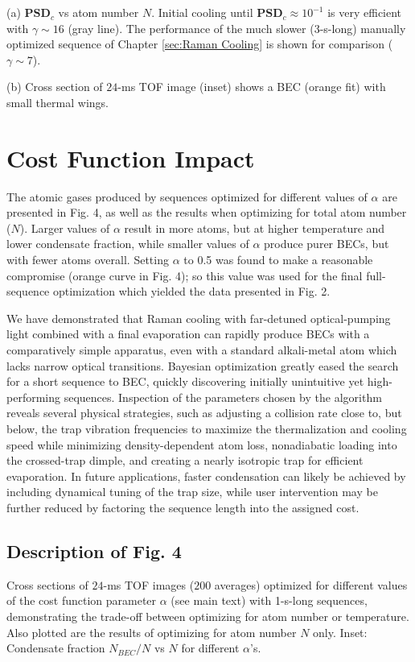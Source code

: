 \documentclass{article}
\begin{document}
(a) $\mathbf{PSD}_c$ vs atom number $N$. Initial cooling until $\mathbf{PSD}_c \approx 10^{-1}$ is very efficient with $\gamma \sim 16$ (gray line). The performance of the much slower (3-s-long) manually optimized sequence of Chapter \ref{sec:Raman Cooling} is shown for comparison ($\gamma \sim 7$). 

(b) Cross section of $24$-ms TOF image (inset) shows a BEC (orange fit) with small thermal wings.

\section{Cost Function Impact}
The atomic gases produced by sequences optimized for different values of $\alpha$ are presented in Fig. 4, as well as the results when optimizing for total atom number ($N$). Larger values of $\alpha$ result in more atoms, but at higher temperature and lower condensate fraction, while smaller values of $\alpha$ produce purer BECs, but with fewer atoms overall. Setting $\alpha$ to 0.5 was found to make a reasonable compromise (orange curve in Fig. 4); so this value was used for the final full-sequence optimization which yielded the data presented in Fig. 2.

We have demonstrated that Raman cooling with far-detuned optical-pumping light combined with a final evaporation can rapidly produce BECs with a comparatively simple apparatus, even with a standard alkali-metal atom which lacks narrow optical transitions. Bayesian optimization greatly eased the search for a short sequence to BEC, quickly discovering initially unintuitive yet high-performing sequences. Inspection of the parameters chosen by the algorithm reveals several physical strategies, such as adjusting a collision rate close to, but below, the trap vibration frequencies to maximize the thermalization and cooling speed while minimizing density-dependent atom loss, nonadiabatic loading into the crossed-trap dimple, and creating a nearly isotropic trap for efficient evaporation. In future applications, faster condensation can likely be achieved by including dynamical tuning of the trap size, while user intervention may be further reduced by factoring the sequence length into the assigned cost.

\subsection{Description of Fig. 4}
Cross sections of $24$-ms TOF images ($200$ averages) optimized for different values of the cost function parameter $\alpha$ (see main text) with 1-s-long sequences, demonstrating the trade-off between optimizing for atom number or temperature. Also plotted are the results of optimizing for atom number $N$ only. Inset: Condensate fraction $N_{BEC}/N$ vs $N$ for different $\alpha$’s.
\end{document}
